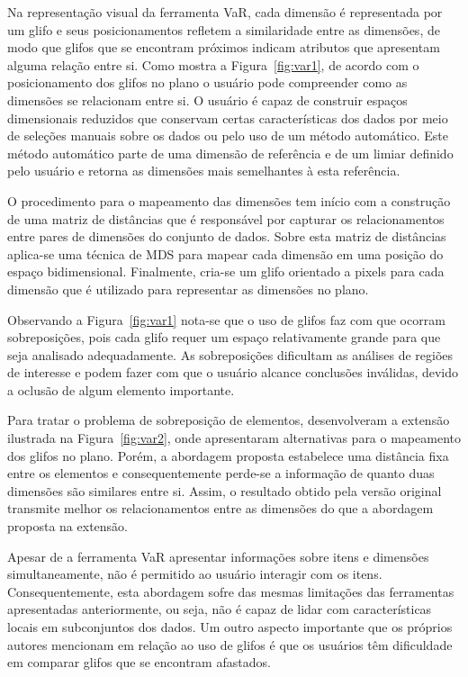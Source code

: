 Na representação visual da ferramenta VaR, cada dimensão é
representada por um glifo e seus posicionamentos refletem a
similaridade entre as dimensões, de modo que glifos que se
encontram próximos indicam atributos que apresentam alguma
relação entre si. Como mostra a Figura~\ref{fig:var1}, de
acordo com o posicionamento dos glifos no plano o usuário
pode compreender como as dimensões se relacionam entre si. O
usuário é capaz de construir espaços dimensionais reduzidos
que conservam certas características dos dados por meio de
seleções manuais sobre os dados ou pelo uso de um método automático.
Este método automático parte de uma dimensão de referência e
de um limiar definido pelo usuário e retorna as dimensões
mais semelhantes à esta referência.

O procedimento para o mapeamento das dimensões tem início
com a construção de uma matriz de distâncias que é
responsável por capturar os relacionamentos entre pares de
dimensões do conjunto de dados. Sobre esta matriz de
distâncias aplica-se uma técnica de MDS para mapear cada
dimensão em uma posição do espaço bidimensional.
Finalmente, cria-se um glifo orientado a pixels para cada
dimensão que é utilizado para representar as dimensões
no plano.

Observando a Figura~\ref{fig:var1} nota-se que o
uso de glifos faz com que ocorram sobreposições, pois cada
glifo requer um espaço relativamente grande para que seja
analisado adequadamente.  As sobreposições dificultam as
análises de regiões de interesse e podem fazer com que o
usuário alcance conclusões inválidas, devido a oclusão de
algum elemento importante.  

Para tratar o problema de sobreposição de elementos,
\citet{Yang2007} desenvolveram a extensão ilustrada na
Figura~\ref{fig:var2}, onde apresentaram alternativas para o
mapeamento dos glifos no plano. Porém, a abordagem 
proposta estabelece uma distância fixa entre os elementos e
consequentemente perde-se a informação de quanto duas
dimensões são similares entre si. Assim, o resultado obtido
pela versão original transmite melhor os relacionamentos entre
as dimensões do que a abordagem proposta na extensão. 

Apesar de a ferramenta VaR apresentar informações sobre itens
e dimensões simultaneamente, não é permitido ao usuário
interagir com os itens. Consequentemente, esta abordagem
sofre das mesmas limitações das ferramentas apresentadas
anteriormente, ou seja, não é capaz de lidar com  
características locais em subconjuntos dos dados. Um outro
aspecto importante que os próprios autores mencionam em
relação ao uso de glifos é que os usuários têm dificuldade
em comparar glifos que se encontram afastados. 

